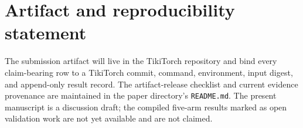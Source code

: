 \documentclass[10pt]{article}
\newcommand{\code}[1]{\texttt{#1}}
\begin{document}
\section*{Artifact and reproducibility statement}

The submission artifact will live in the TikiTorch repository and bind every
claim-bearing row to a TikiTorch commit, command, environment, input digest, and
append-only result record.  The artifact-release checklist and current evidence
provenance are maintained in the paper directory's \code{README.md}.  The
present manuscript is a discussion draft; the compiled five-arm results marked
as open validation work are not yet available and are not claimed.





\end{document}

